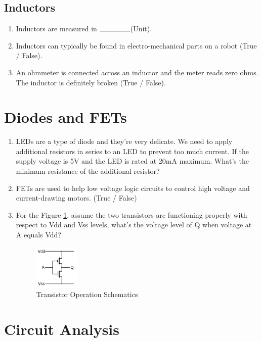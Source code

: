 \documentclass{article}
\newcommand{\ans}{$\rule{1.5cm}{0.15mm}$}
\begin{document}
\subsection{Inductors}
\begin{enumerate}
	\item Inductors are measured in \ans  (Unit).
	\item Inductors can typically be found in electro-mechanical parts on a robot (True / False).
	\item An ohmmeter is connected across an inductor and the meter reads zero ohms. The inductor is definitely broken (True / False).
\end{enumerate}

\section{Diodes and FETs}
\begin{enumerate}
	\item LEDs are a type of diode and they're very delicate. We need to apply additional resistors in series to an LED to prevent too much current. If the supply voltage is 5V and the LED is rated at 20mA maximum. What's the minimum resistance of the additional resistor?
	\item FETs are used to help low voltage logic circuits to control high voltage and current-drawing motors. (True / False)
	\item For the Figure \ref{fig:transistor}, assume the two transistors are functioning properly with respect to Vdd and Vss levels, what's the voltage level of Q when voltage at A equals Vdd?

	\begin{figure}[!h]
		\center
		\includegraphics[width=0.2\textwidth, keepaspectratio]{fetoperation}
		\caption{Transistor Operation Schematics}
		\label{fig:transistor}
	\end{figure}
\end{enumerate}

\section{Circuit Analysis}
\end{document}
